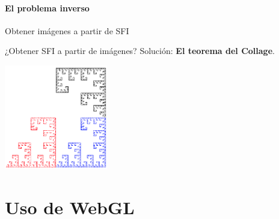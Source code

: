 \begin{frame}{\insertsectionhead}
\framesubtitle{El problema inverso}
{\large
\centering Obtener imágenes a partir de SFI \checked

\centering ¿Obtener SFI a partir de imágenes? \pause Solución: \textbf{El teorema del Collage}.
}
\vspace{\fill}
\centering \includegraphics[width=4.5cm]{screenshots/collage.png}
    
\end{frame}

\section{Uso de WebGL}

